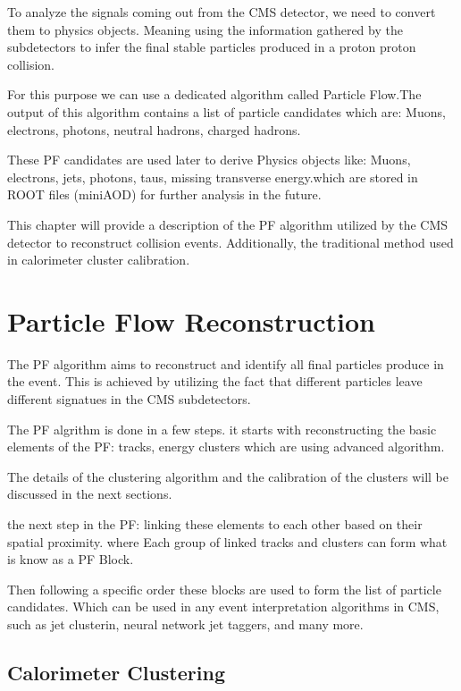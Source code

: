 
To analyze the signals coming out from the CMS detector, we need to convert them to physics objects. Meaning using the information gathered by the subdetectors to infer the final stable particles produced in a proton proton collision.

For this purpose we can use a dedicated algorithm called Particle Flow.The output of this algorithm contains a list of particle candidates which are: Muons, electrons, photons, neutral hadrons, charged hadrons.

These PF candidates are used later to derive Physics objects like: Muons, electrons, jets, photons, taus,  missing transverse energy.which are stored in ROOT files (miniAOD) for further analysis in the future.

This chapter will provide a description of the PF algorithm utilized by the CMS detector to reconstruct collision events. Additionally, the traditional method used in calorimeter cluster calibration.   


\section{Particle Flow Reconstruction}

The PF algorithm aims to reconstruct and identify all final particles produce in the event.
This is achieved  by utilizing the fact that different particles leave different signatues in the CMS subdetectors.

The PF algrithm is done in a few steps.
it starts with reconstructing the basic elements of the PF: tracks, energy clusters which are using advanced algorithm.

The details of the clustering algorithm and the calibration of the clusters will be discussed in the next sections.

the next step in the PF: linking these elements to each other based on their spatial proximity.
where Each group of linked tracks and clusters can form what is know as a PF Block.

Then following a specific order these blocks are used to form the list of particle candidates.
Which can be used in any event interpretation algorithms in CMS, such as jet clusterin, neural network jet taggers, and  many more.

\subsection{Calorimeter Clustering}

